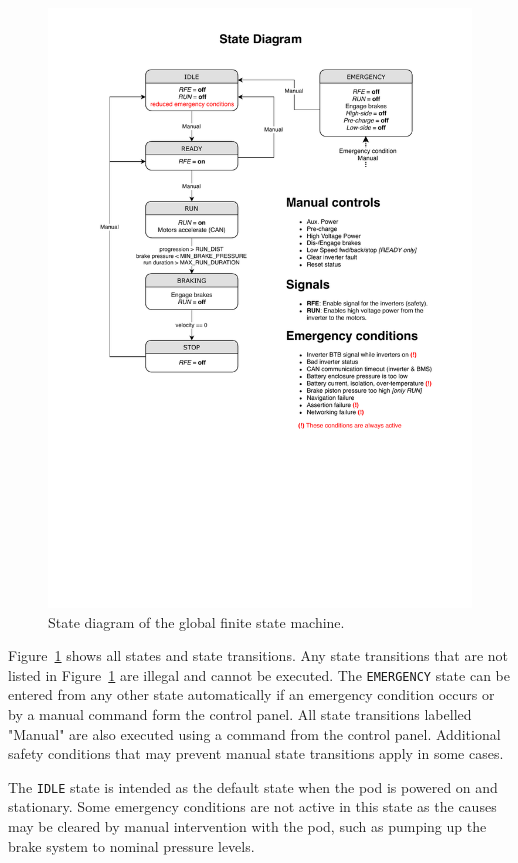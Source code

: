 \begin{figure}[H]
    \centering \includegraphics[width=1.0\textwidth]{./figures/state_diagram.pdf}
    \caption{State diagram of the global finite state machine.}
    \label{fig:state_diagram}
\end{figure}

Figure~\ref{fig:state_diagram} shows all states and state transitions. Any state transitions that are not listed in Figure~\ref{fig:state_diagram} are illegal and cannot be executed. The \texttt{EMERGENCY} state can be entered from any other state automatically if an emergency condition occurs or by a manual command form the control panel. All state transitions labelled "Manual" are also executed using a command from the control panel. Additional safety conditions that may prevent manual state transitions apply in some cases.

The \texttt{IDLE} state is intended as the default state when the pod is powered on and stationary. Some emergency conditions are not active in this state as the causes may be cleared by manual intervention with the pod, such as pumping up the brake system to nominal pressure levels.

